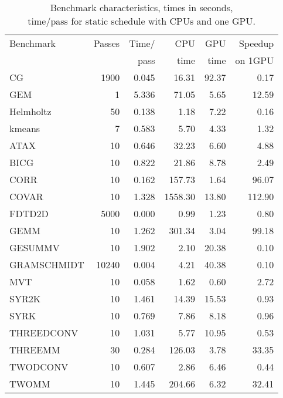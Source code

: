 \begin{table}[t]
    \centering
\footnotesize{
    \begin{tabular}{|l|r|r|r|r|r|}
        \hline
        Benchmark   & Passes & Time/ & CPU     & GPU   & Speedup \\
                    &        & pass  & time    & time  & on 1GPU \\
        \hline
        CG          & 1900   & 0.045 & 16.31   & 92.37 & 0.17    \\
        GEM         & 1      & 5.336 & 71.05   & 5.65  & 12.59   \\
        Helmholtz   & 50     & 0.138 & 1.18    & 7.22  & 0.16    \\
        kmeans      & 7      & 0.583 & 5.70    & 4.33  & 1.32    \\
        \hline
        ATAX        & 10     & 0.646 & 32.23   & 6.60  & 4.88    \\
        BICG        & 10     & 0.822 & 21.86   & 8.78  & 2.49    \\
        CORR        & 10     & 0.162 & 157.73  & 1.64  & 96.07   \\
        COVAR       & 10     & 1.328 & 1558.30 & 13.80 & 112.90  \\
        FDTD2D      & 5000   & 0.000 & 0.99    & 1.23  & 0.80    \\
        GEMM        & 10     & 1.262 & 301.34  & 3.04  & 99.18   \\
        GESUMMV     & 10     & 1.902 & 2.10    & 20.38 & 0.10    \\
        GRAMSCHMIDT & 10240  & 0.004 & 4.21    & 40.38 & 0.10    \\
        MVT         & 10     & 0.058 & 1.62    & 0.60  & 2.72    \\
        SYR2K       & 10     & 1.461 & 14.39   & 15.53 & 0.93    \\
        SYRK        & 10     & 0.769 & 7.86    & 8.18  & 0.96    \\
        THREEDCONV  & 10     & 1.031 & 5.77    & 10.95 & 0.53    \\
        THREEMM     & 30     & 0.284 & 126.03  & 3.78  & 33.35   \\
        TWODCONV    & 10     & 0.607 & 2.86    & 6.46  & 0.44    \\
        TWOMM       & 10     & 1.445 & 204.66  & 6.32  & 32.41   \\
        \hline
    \end{tabular}
}
    \caption{Benchmark characteristics, times in seconds, \\
             time/pass for static schedule with CPUs and one GPU.\label{tab:bench}}
\end{table}

